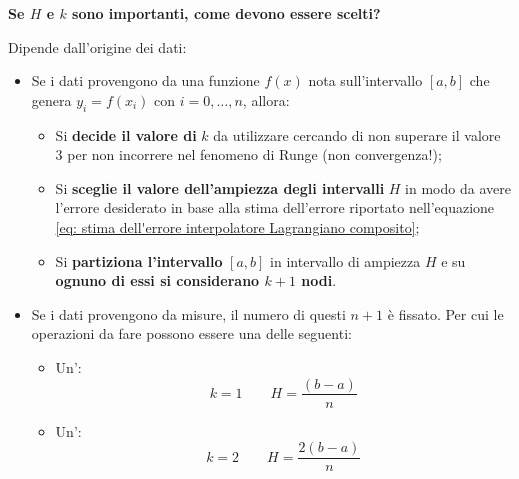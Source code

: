 \newpage

\begin{flushleft}
	\textcolor{Green3}{ \textbf{Se $H$ e $k$ sono importanti, come devono essere scelti?}}
\end{flushleft}
Dipende dall'origine dei dati:
\begin{itemize}
	\item Se i dati provengono da una funzione $f\left(x\right)$ nota sull'intervallo $\left[a,b\right]$ che genera $y_{i} = f\left(x_{i}\right)$ con $i = 0, \dots, n$, allora:
	\begin{itemize}
		\item Si \textbf{decide il valore di} $k$ da utilizzare cercando di non superare il valore $3$ per non incorrere nel fenomeno di Runge (non convergenza!);
		
		\item Si \textbf{sceglie il valore dell'ampiezza degli intervalli} $H$ in modo da avere l'errore desiderato in base alla stima dell'errore riportato nell'equazione \ref{eq: stima dell'errore interpolatore Lagrangiano composito};
		
		\item Si \textbf{partiziona l'intervallo} $\left[a,b\right]$ in intervallo di ampiezza $H$ e su \textbf{ognuno di essi si considerano $k+1$ nodi}.
	\end{itemize}
	
	\item Se i dati provengono da misure, il numero di questi $n+1$ è fissato. Per cui le operazioni da fare possono essere una delle seguenti:
	\begin{itemize}
		\item Un':
		\begin{equation*}
			k=1 \hspace{2em} H = \dfrac{\left(b-a\right)}{n}
		\end{equation*}
		
		\item Un':
		\begin{equation*}
			k = 2 \hspace{2em} H = \dfrac{2\left(b-a\right)}{n}
		\end{equation*}
	\end{itemize}
\end{itemize}